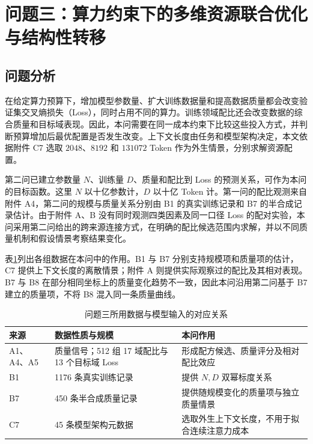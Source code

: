 \setcounter{section}{5}
\section{问题三：算力约束下的多维资源联合优化与结构性转移}
\label{sec:q3}
\setcounter{equation}{0}
\setcounter{figure}{0}
\setcounter{table}{0}

\subsection{问题分析}

在给定算力预算下，增加模型参数量、扩大训练数据量和提高数据质量都会改变验证集交叉熵损失（Loss）\cite{hoffmann2022training,fineweb2024}，同时占用不同的算力。训练领域配比还会改变数据的综合质量和目标域表现。因此，本问需要在同一成本约束下比较这些投入方式，并判断预算增加后最优配置是否发生改变。上下文长度由任务和模型架构决定，本文依据附件 C7 选取 $2048$、$8192$ 和 $131072$ Token 作为外生情景，分别求解资源配置。

第二问已建立参数量 $N$、训练量 $D$、质量和配比到 Loss 的预测关系，可作为本问的目标函数。这里 $N$ 以十亿参数计，$D$ 以十亿 Token 计。第一问的配比观测来自附件 A4，第二问的规模与质量关系分别由 B1 的真实训练记录和 B7 的半合成记录估计。由于附件 A、B 没有同时观测四类因素及同一口径 Loss 的配对实验，本问采用第二问给出的跨来源连接方式，在明确的配比候选范围内求解，并以不同质量机制和假设情景考察结果变化。

表\ref{tab:q3-data-roles}列出各组数据在本问中的作用。B1 与 B7 分别支持规模项和质量项的估计，C7 提供上下文长度的离散情景；附件 A 则提供实际观察过的配比及其相对表现。B7 与 B8 在部分相同坐标上的质量变化趋势不一致，因此本问沿用第二问基于 B7 建立的质量项，不将 B8 混入同一条质量曲线。

\begin{table}[htbp]
 \centering\small
 \caption{问题三所用数据与模型输入的对应关系}
 \label{tab:q3-data-roles}
 \begin{tabular}{lp{4.0cm}p{6.1cm}}
 \toprule
 来源 & 数据性质与规模 & 本问作用\\
 \midrule
 A1、A4、A5 & 质量信号；512 组 17 域配比与 13 个目标域 Loss & 形成配方候选、质量评分及相对配比效应\\
 B1 & 1176 条真实训练记录 & 提供 $N,D$ 双幂标度关系\\
 B7 & 450 条半合成质量记录 & 提供随规模变化的质量项与独立质量情景\\
 C7 & 45 条模型架构元数据 & 选取外生上下文长度，不用于拟合连续注意力成本\\
 \bottomrule
 \end{tabular}
\end{table}

